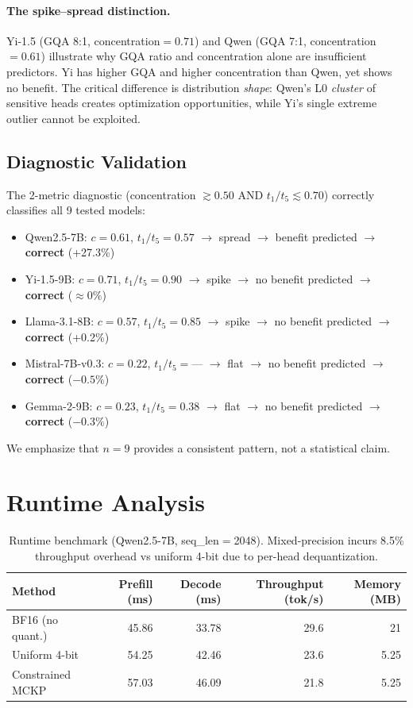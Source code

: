 \documentclass[11pt,a4paper]{article}
\begin{document}
\paragraph{The spike--spread distinction.}
Yi-1.5 (GQA 8:1, concentration$=0.71$) and Qwen (GQA 7:1, concentration$=0.61$) illustrate why GQA ratio and concentration alone are insufficient predictors.
Yi has higher GQA and higher concentration than Qwen, yet shows no benefit.
The critical difference is distribution \emph{shape}: Qwen's L0 \emph{cluster} of sensitive heads creates optimization opportunities, while Yi's single extreme outlier cannot be exploited.

\subsection{Diagnostic Validation}

The 2-metric diagnostic (concentration $\gtrsim 0.50$ AND $t_1/t_5 \lesssim 0.70$) correctly classifies all 9 tested models:
\begin{itemize}[leftmargin=*,itemsep=1pt]
\item Qwen2.5-7B: $c{=}0.61$, $t_1/t_5{=}0.57$ $\to$ spread $\to$ benefit predicted $\to$ \textbf{correct} (+27.3\%)
\item Yi-1.5-9B: $c{=}0.71$, $t_1/t_5{=}0.90$ $\to$ spike $\to$ no benefit predicted $\to$ \textbf{correct} ($\approx 0\%$)
\item Llama-3.1-8B: $c{=}0.57$, $t_1/t_5{=}0.85$ $\to$ spike $\to$ no benefit predicted $\to$ \textbf{correct} (+0.2\%)
\item Mistral-7B-v0.3: $c{=}0.22$, $t_1/t_5{=}$--- $\to$ flat $\to$ no benefit predicted $\to$ \textbf{correct} ($-0.5\%$)
\item Gemma-2-9B: $c{=}0.23$, $t_1/t_5{=}0.38$ $\to$ flat $\to$ no benefit predicted $\to$ \textbf{correct} ($-0.3\%$)
\end{itemize}
We emphasize that $n{=}9$ provides a consistent pattern, not a statistical claim.

\section{Runtime Analysis}
\label{sec:runtime}

\begin{table}[h]
\centering
\caption{Runtime benchmark (Qwen2.5-7B, seq\_len$=$2048). Mixed-precision incurs 8.5\% throughput overhead vs uniform 4-bit due to per-head dequantization.}
\label{tab:runtime}
\begin{tabular}{@{}lrrrr@{}}
\toprule
Method & Prefill (ms) & Decode (ms) & Throughput (tok/s) & Memory (MB) \\
\midrule
BF16 (no quant.) & 45.86 & 33.78 & 29.6 & 21 \\
Uniform 4-bit & 54.25 & 42.46 & 23.6 & 5.25 \\
Constrained MCKP & 57.03 & 46.09 & 21.8 & 5.25 \\
\bottomrule
\end{tabular}
\end{table}
\end{document}
